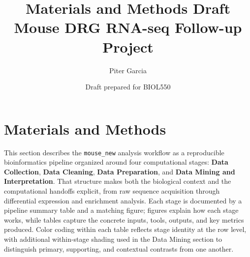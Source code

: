 \documentclass[12pt]{article}
\title{Materials and Methods Draft\\Mouse DRG RNA-seq Follow-up Project}
\author{Piter Garcia}
\date{Draft prepared for BIOL550}
\begin{document}
\maketitle


\section{Materials and Methods}


This section describes the \texttt{mouse\_new} analysis workflow as a reproducible bioinformatics pipeline organized around four computational stages: \textbf{Data Collection}, \textbf{Data Cleaning}, \textbf{Data Preparation}, and \textbf{Data Mining and Interpretation}. That structure makes both the biological context and the computational handoffs explicit, from raw sequence acquisition through differential expression and enrichment analysis. Each stage is documented by a pipeline summary table and a matching figure; figures explain how each stage works, while tables capture the concrete inputs, tools, outputs, and key metrics produced. Color coding within each table reflects stage identity at the row level, with additional within-stage shading used in the Data Mining section to distinguish primary, supporting, and contextual contrasts from one another.
\end{document}
